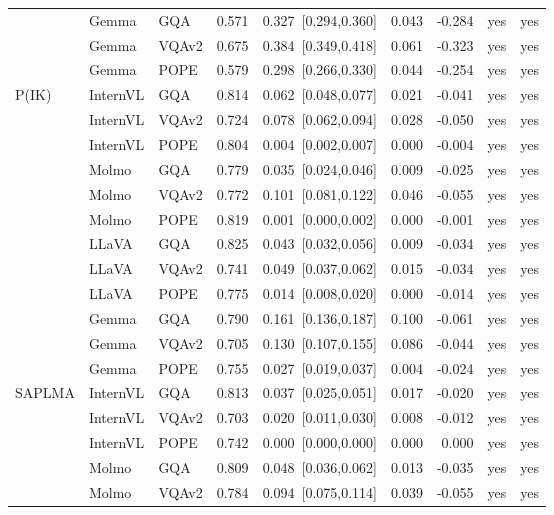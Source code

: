 \begin{longtable}{@{}lll rrrr cc@{}}
 & Gemma & GQA & 0.571 & 0.327~{\scriptsize[0.294,0.360]} & 0.043 & -0.284 & yes & yes \\
 & Gemma & VQAv2 & 0.675 & 0.384~{\scriptsize[0.349,0.418]} & 0.061 & -0.323 & yes & yes \\
 & Gemma & POPE & 0.579 & 0.298~{\scriptsize[0.266,0.330]} & 0.044 & -0.254 & yes & yes \\
\midrule
P(IK) & InternVL & GQA & 0.814 & 0.062~{\scriptsize[0.048,0.077]} & 0.021 & -0.041 & yes & yes \\
 & InternVL & VQAv2 & 0.724 & 0.078~{\scriptsize[0.062,0.094]} & 0.028 & -0.050 & yes & yes \\
 & InternVL & POPE & 0.804 & 0.004~{\scriptsize[0.002,0.007]} & 0.000 & -0.004 & yes & yes \\
 & Molmo & GQA & 0.779 & 0.035~{\scriptsize[0.024,0.046]} & 0.009 & -0.025 & yes & yes \\
 & Molmo & VQAv2 & 0.772 & 0.101~{\scriptsize[0.081,0.122]} & 0.046 & -0.055 & yes & yes \\
 & Molmo & POPE & 0.819 & 0.001~{\scriptsize[0.000,0.002]} & 0.000 & -0.001 & yes & yes \\
 & LLaVA & GQA & 0.825 & 0.043~{\scriptsize[0.032,0.056]} & 0.009 & -0.034 & yes & yes \\
 & LLaVA & VQAv2 & 0.741 & 0.049~{\scriptsize[0.037,0.062]} & 0.015 & -0.034 & yes & yes \\
 & LLaVA & POPE & 0.775 & 0.014~{\scriptsize[0.008,0.020]} & 0.000 & -0.014 & yes & yes \\
 & Gemma & GQA & 0.790 & 0.161~{\scriptsize[0.136,0.187]} & 0.100 & -0.061 & yes & yes \\
 & Gemma & VQAv2 & 0.705 & 0.130~{\scriptsize[0.107,0.155]} & 0.086 & -0.044 & yes & yes \\
 & Gemma & POPE & 0.755 & 0.027~{\scriptsize[0.019,0.037]} & 0.004 & -0.024 & yes & yes \\
\midrule
SAPLMA & InternVL & GQA & 0.813 & 0.037~{\scriptsize[0.025,0.051]} & 0.017 & -0.020 & yes & yes \\
 & InternVL & VQAv2 & 0.703 & 0.020~{\scriptsize[0.011,0.030]} & 0.008 & -0.012 & yes & yes \\
 & InternVL & POPE & 0.742 & 0.000~{\scriptsize[0.000,0.000]} & 0.000 & 0.000 & yes & yes \\
 & Molmo & GQA & 0.809 & 0.048~{\scriptsize[0.036,0.062]} & 0.013 & -0.035 & yes & yes \\
 & Molmo & VQAv2 & 0.784 & 0.094~{\scriptsize[0.075,0.114]} & 0.039 & -0.055 & yes & yes \\

\end{longtable}

